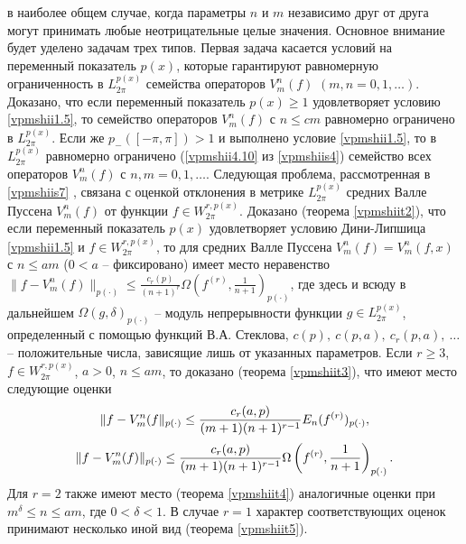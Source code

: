  в наиболее общем случае, когда параметры $n$   и $m$ независимо друг от друга могут принимать любые неотрицательные целые значения.
Основное внимание будет уделено задачам трех типов. Первая задача касается условий на переменный показатель $p(x)$, которые гарантируют  равномерную ограниченность в $L_{2\pi}^{p(x)}$ семейства операторов  $V_m^n(f)$ $(m,n=0,1,\ldots)$. Доказано, что если переменный показатель $p(x)\ge1$ удовлетворяет условию \eqref{vpmshii1.5}, то семейство операторов  $V_m^n(f)$ с $n\le cm$ равномерно ограничено в $L_{2\pi}^{p(x)}$. Если же $p_-([-\pi,\pi])>1$ и выполнено условие \eqref{vpmshii1.5}, то  в $L_{2\pi}^{p(x)}$ равномерно ограничено (\eqref{vpmshii4.10} из \ref{vpmshiis4}) семейство всех операторов  $V_m^n(f)$ с $n,m=0,1,\ldots$. Следующая проблема, рассмотренная в \ref{vpmshiis7}  , связана с оценкой отклонения в метрике  $L_{2\pi}^{p(x)}$
средних Валле Пуссена $V_m^n(f)$  от функции $f\in W_{2\pi}^{r,p(x)}$. Доказано (теорема \ref{vpmshiit2}), что если переменный показатель $p(x)$ удовлетворяет условию Дини-Липшица \eqref{vpmshii1.5} и $f\in W^{r,p(x)}_{2\pi}$,
то для средних Валле  Пуссена $V_m^n(f)=V_m^n(f,x)$ с $ n\le am$ ($0<a$ -- фиксировано) имеет место неравенство
 $\|f-V_m^n(f)\|_{p(\cdot)}\le \frac{c_r(p)}{(n+1)^r}\Omega(f^{(r)},\frac1{n+1})_{p(\cdot)}$,  где здесь и всюду в дальнейшем $\Omega(g,\delta)_{p(\cdot)}$ -- модуль непрерывности функции $g\in L^{p(x)}_{2\pi}$, определенный с помощью функций В.А. Стеклова, $c(p),\ c(p,a),\ c_r(p,a),\ \ldots $ -- положительные числа, зависящие лишь от указанных параметров.
 Если  $r\ge3$, $f\in W^{r,p(x)}_{2\pi}$, $a>0$, $ n\le am$, то доказано (теорема \ref{vpmshiit3}), что имеют место следующие оценки
\begin{equation*}
   \|f-V_m^n(f\|_{p(\cdot)}\le {c_r(a,p)\over(m+1) (n+1)^{r-1}}E_n(f^{(r)})_{p(\cdot)},
\end{equation*}
\begin{equation*}
   \|f-V_m^n(f)\|_{p(\cdot)}\le {c_r(a,p)\over(m+1) (n+1)^{r-1}}\Omega\left(f^{(r)},\frac1{n+1}\right)_{p(\cdot)}.
\end{equation*}
Для $r=2$ также имеют место (теорема \ref{vpmshiit4}) аналогичные оценки при $m^\delta\le n\le am$, где $0<\delta<1$.
В случае $r=1$  характер соответствующих оценок принимают несколько иной вид (теорема \ref{vpmshiit5}).


